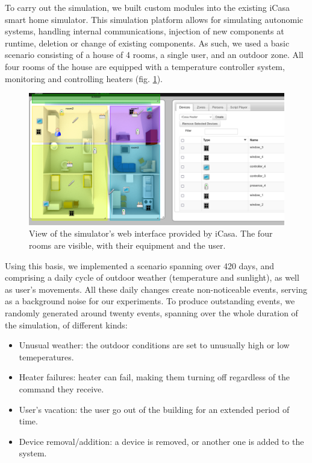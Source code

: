 \documentclass[conference]{IEEEtran}
\begin{document}
To carry out the simulation, we built custom modules into the existing iCasa
smart home simulator\cite{lalanda_self-aware_2017}. This simulation platform
allows for simulating autonomic systems, handling internal communications,
injection of new components at runtime, deletion or change of existing
components. As such, we used a basic scenario consisting of a house of 4 rooms,
a single user, and an outdoor zone. All four rooms of the house are equipped
with a temperature controller system, monitoring and controlling heaters (fig.
\ref{fig:view}).

\begin{figure}[ht]
  \centering
  \includegraphics[width=\linewidth]{figures/simulator}
  \caption{View of the simulator's web interface provided by iCasa. The four
    rooms are visible, with their equipment and the user.}
  \label{fig:view}
\end{figure}

Using this basis, we implemented a scenario spanning over 420 days, and
comprising a daily cycle of outdoor weather (temperature and sunlight), as well
as user's movements. All these daily changes create non-noticeable events,
serving as a background noise for our experiments. To produce outstanding
events, we randomly generated around twenty events, spanning over the whole
duration of the simulation, of different kinds:

\begin{itemize}
    \item Unusual weather: the outdoor conditions are set to unusually high or
        low temeperatures.
    \item Heater failures: heater can fail, making them turning off regardless
        of the command they receive.
    \item User's vacation: the user go out of the building for an extended
        period of time.
    \item Device removal/addition: a device is removed, or another one is added
        to the system.
\end{itemize}
\end{document}
